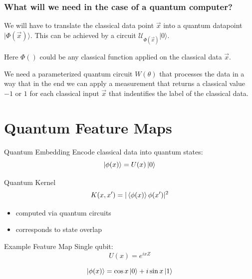 \documentclass{beamer}
\begin{document}
\begin{frame}
\frametitle{What will we need in the case of a quantum computer?}

\begin{block}{}
We will have to translate the classical data point \(\vec{x}\)
into a quantum datapoint \(\vert \Phi{(\vec{x})} \rangle\). This can
be achieved by a circuit $\mathcal{U}_{\Phi(\vec{x})} \vert 0\rangle$.

Here $\Phi()$ could be any classical function applied
on the classical data $\vec{x}$.
\end{block}
\begin{block}{}
We need a parameterized quantum circuit $W(\theta)$ that
processes the data in a way that in the end we
can apply a measurement that returns a classical value \(-1\) or
\(1\) for each classical input \(\vec{x}\) that indentifies the label
of the classical data.
\end{block}
\end{frame}

\section{Quantum Feature Maps}

\begin{frame}{Quantum Embedding}
Encode classical data into quantum states:
\[
\ket{\phi(x)} = U(x)\ket{0}
\]
\end{frame}


\begin{frame}{Quantum Kernel}
\[
K(x,x') = |\braket{\phi(x)}{\phi(x')}|^2
\]

\begin{itemize}
\item computed via quantum circuits
\item corresponds to state overlap
\end{itemize}
\end{frame}


\begin{frame}{Example Feature Map}
Single qubit:
\[
U(x) = e^{i x Z}
\]

\[
\ket{\phi(x)} = \cos x \ket{0} + i \sin x \ket{1}
\]
\end{frame}
\end{document}
